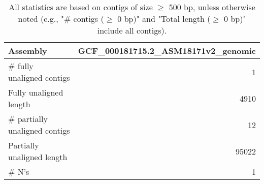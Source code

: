 \documentclass[12pt,a4paper]{article}
\begin{document}
\begin{table}[ht]
\begin{center}
\caption{All statistics are based on contigs of size $\geq$ 500 bp, unless otherwise noted (e.g., "\# contigs ($\geq$ 0 bp)" and "Total length ($\geq$ 0 bp)" include all contigs).}
\begin{tabular}{|l*{1}{|r}|}
\hline
Assembly & GCF\_000181715.2\_ASM18171v2\_genomic \\ \hline
\# fully unaligned contigs & 1 \\ \hline
Fully unaligned length & 4910 \\ \hline
\# partially unaligned contigs & 12 \\ \hline
Partially unaligned length & 95022 \\ \hline
\# N's & 1 \\ \hline
\end{tabular}
\end{center}
\end{table}
\end{document}
